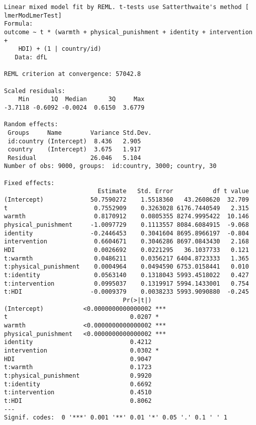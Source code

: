 \documentclass[
  letterpaper,
  DIV=11,
  numbers=noendperiod]{scrreprt}
\begin{document}
\begin{verbatim}
Linear mixed model fit by REML. t-tests use Satterthwaite's method [
lmerModLmerTest]
Formula: 
outcome ~ t * (warmth + physical_punishment + identity + intervention +  
    HDI) + (1 | country/id)
   Data: dfL

REML criterion at convergence: 57042.8

Scaled residuals: 
    Min      1Q  Median      3Q     Max 
-3.7118 -0.6092 -0.0024  0.6150  3.6779 

Random effects:
 Groups     Name        Variance Std.Dev.
 id:country (Intercept)  8.436   2.905   
 country    (Intercept)  3.675   1.917   
 Residual               26.046   5.104   
Number of obs: 9000, groups:  id:country, 3000; country, 30

Fixed effects:
                          Estimate   Std. Error           df t value
(Intercept)             50.7590272    1.5518360   43.2608620  32.709
t                        0.7552909    0.3263028 6176.7440549   2.315
warmth                   0.8170912    0.0805355 8274.9995422  10.146
physical_punishment     -1.0097729    0.1113557 8084.6084915  -9.068
identity                -0.2446453    0.3041604 8695.8966197  -0.804
intervention             0.6604671    0.3046286 8697.0843430   2.168
HDI                      0.0026692    0.0221295   36.1037733   0.121
t:warmth                 0.0486211    0.0356217 6404.8723333   1.365
t:physical_punishment    0.0004964    0.0494590 6753.0158441   0.010
t:identity               0.0563140    0.1318043 5993.4518022   0.427
t:intervention           0.0995037    0.1319917 5994.1433001   0.754
t:HDI                   -0.0009379    0.0038233 5993.9090880  -0.245
                                 Pr(>|t|)    
(Intercept)           <0.0000000000000002 ***
t                                  0.0207 *  
warmth                <0.0000000000000002 ***
physical_punishment   <0.0000000000000002 ***
identity                           0.4212    
intervention                       0.0302 *  
HDI                                0.9047    
t:warmth                           0.1723    
t:physical_punishment              0.9920    
t:identity                         0.6692    
t:intervention                     0.4510    
t:HDI                              0.8062    
---
Signif. codes:  0 '***' 0.001 '**' 0.01 '*' 0.05 '.' 0.1 ' ' 1


\end{verbatim}
\end{document}
